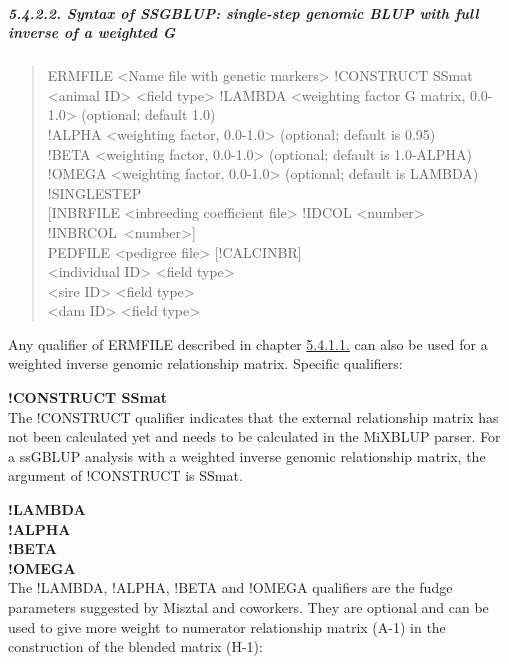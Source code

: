 \subparagraph{5.4.2.2. Syntax of SSGBLUP: single-step genomic BLUP with
full inverse of a weighted G}\label{Gene37}

\begin{quote}
ERMFILE \textless Name file with genetic markers\textgreater{}
!CONSTRUCT SSmat\\
\textless animal ID\textgreater{} \textless field type\textgreater{}
!LAMBDA \textless weighting factor G matrix, 0.0-1.0\textgreater{}
(optional; default 1.0)\\
!ALPHA \textless weighting factor, 0.0-1.0\textgreater{} (optional;
default is 0.95)\\
!BETA \textless weighting factor, 0.0-1.0\textgreater{} (optional;
default is 1.0-ALPHA)\\
!OMEGA \textless weighting factor, 0.0-1.0\textgreater{} (optional;
default is LAMBDA)\\
!SINGLESTEP\\
{[}INBRFILE \textless inbreeding coefficient file\textgreater{} !IDCOL
\textless number\textgreater{}
!INBRCOL~\textless number\textgreater{]}\\
PEDFILE \textless pedigree file\textgreater{} {[}!CALCINBR{]}\\
\textless individual ID\textgreater{} \textless field
type\textgreater{}\\
\textless sire ID\textgreater{} \textless field type\textgreater{}\\
\textless dam ID\textgreater{} \textless field type\textgreater{}
\end{quote}

Any qualifier of ERMFILE described in chapter
\hyperref[Gene31]{5.4.1.1.} can also be used for a weighted inverse
genomic relationship matrix. Specific qualifiers:

\textbf{!CONSTRUCT SSmat}\\
The !CONSTRUCT qualifier indicates that the external relationship matrix
has not been calculated yet and needs to be calculated in the MiXBLUP
parser. For a ssGBLUP analysis with a weighted inverse genomic
relationship matrix, the argument of !CONSTRUCT is SSmat.

\textbf{!LAMBDA }\\
\textbf{!ALPHA }\\
\textbf{!BETA }\\
\textbf{!OMEGA }\\
The !LAMBDA, !ALPHA, !BETA and !OMEGA qualifiers are the fudge
parameters suggested by Misztal and coworkers. They are optional and can
be used to give more weight to numerator relationship matrix (A-1) in
the construction of the blended matrix (H-1):

